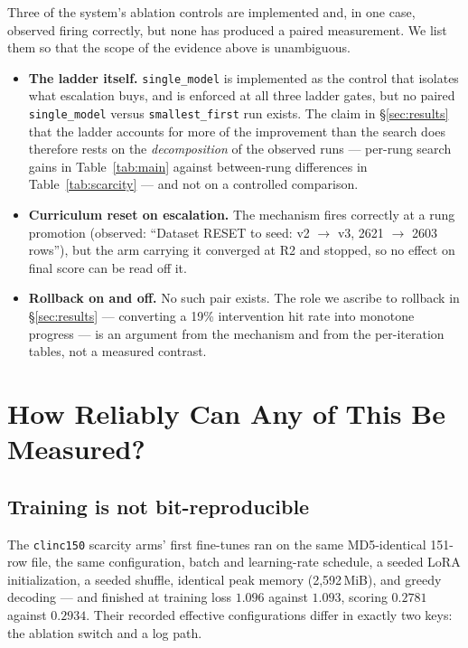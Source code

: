 \documentclass[sigconf,10pt]{acmart}
\newcommand{\xref}[1]{\S\ref{#1}}
\newcommand{\tsk}[1]{\texttt{#1}}
\newcommand{\squishlist}{\begin{itemize}[itemsep=1pt,parsep=2pt,topsep=3pt,partopsep=0pt,leftmargin=0em,itemindent=1em,labelwidth=1em,labelsep=0.5em]}
\newcommand{\squishend}{\end{itemize}}
\begin{document}
Three of the system's ablation controls are implemented and, in one case, observed firing
correctly, but none has produced a paired measurement. We list them so that the scope of the
evidence above is unambiguous.

\squishlist
\item \textbf{The ladder itself.} \texttt{single\_model} is implemented as the control that
isolates what escalation buys, and is enforced at all three ladder gates, but no paired
\texttt{single\_model} versus \texttt{smallest\_first} run exists. The claim in
\xref{sec:results} that the ladder accounts for more of the improvement than the search does
therefore rests on the \emph{decomposition} of the observed runs --- per-rung search gains in
Table~\ref{tab:main} against between-rung differences in Table~\ref{tab:scarcity} --- and not
on a controlled comparison.
\item \textbf{Curriculum reset on escalation.} The mechanism fires correctly at a rung
promotion (observed: ``Dataset RESET to seed: v2 $\to$ v3, 2621 $\to$ 2603 rows''), but the
arm carrying it converged at R2 and stopped, so no effect on final score can be read off it.
\item \textbf{Rollback on and off.} No such pair exists. The role we ascribe to rollback in
\xref{sec:results} --- converting a 19\% intervention hit rate into monotone progress --- is
an argument from the mechanism and from the per-iteration tables, not a measured contrast.
\squishend

\section{How Reliably Can Any of This Be Measured?}
\label{sec:reliability}

\subsection{Training is not bit-reproducible}

The \tsk{clinc150} scarcity arms' first fine-tunes ran on the same MD5-identical 151-row file,
the same configuration, batch and learning-rate schedule, a seeded LoRA initialization, a
seeded shuffle, identical peak memory (2{,}592\,MiB), and greedy decoding --- and finished at
training loss $1.096$ against $1.093$, scoring $0.2781$ against $0.2934$. Their recorded
effective configurations differ in exactly two keys: the ablation switch and a log path.
\end{document}
